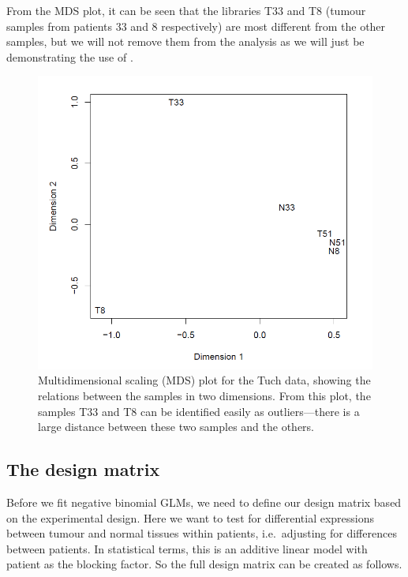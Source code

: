 From the MDS plot, it can be seen that the libraries T33 and T8
(tumour samples from patients 33 and 8 respectively) are most
different from the other samples, but we will not remove them from the
analysis as we will just be demonstrating the use of \edgeR.

\begin{figure}[ht]
\begin{center}
\includegraphics[height=0.45\textheight]{edgeR_case_study_Tuch_MDSplot.png}
\caption{Multidimensional scaling (MDS) plot for the Tuch data,
  showing the relations between the samples in two dimensions. From
  this plot, the samples T33 and T8 can be identified easily as outliers---there is a large distance between these two samples and the others.}
\label{fig:Tuch_MDS}
\end{center}
\end{figure}

\subsection{The design matrix}

Before we fit negative binomial GLMs, we need to define our design
matrix based on the experimental design. Here we want to test for
differential expressions between tumour and normal tissues within
patients, i.e.~adjusting for differences between patients. In
statistical terms, this is an additive linear model with patient as
the blocking factor. So the full design matrix can be created as
follows.


